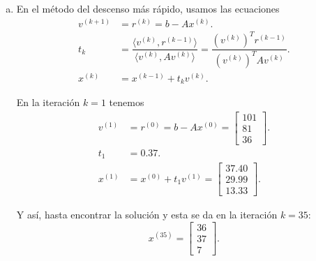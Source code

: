 \begin{frame}
	\begin{solution}
		\begin{enumerate}[b)]
			\item

			      En el método del descenso más rápido, usamos las
			      ecuaciones
			      \begin{align*}
				      v^{\left(k+1\right)} & =
				      r^{\left(k\right)}=
				      b-Ax^{\left(k\right)}.   \\
				      t_{k}                & =
				      \dfrac{
					      \langle
					      v^{\left(k\right)},
					      r^{\left(k-1\right)}
					      \rangle
				      }{
					      \langle
					      v^{\left(k\right)},
					      Av^{\left(k\right)}
					      \rangle
				      }=
				      \dfrac{
				      \left(v^{\left(k\right)}\right)^{T}r^{\left(k-1\right)}
				      }{
				      \left(v^{\left(k\right)}\right)^{T}Av^{\left(k\right)}
				      }.                       \\
				      x^{\left(k\right)}   & =
				      x^{\left(k-1\right)}+
				      t_{k}v^{\left(k\right)}.
			      \end{align*}

			      En la iteración $k=1$ tenemos
			      \begin{align*}
				      v^{\left(1\right)} & =
				      r^{\left(0\right)}=
				      b-Ax^{\left(0\right)}=
				      \begin{bmatrix}
					      101 \\
					      81  \\
					      36
				      \end{bmatrix}.         \\
				      t_{1}              & =
				      0.37.                  \\
				      x^{\left(1\right)} & =
				      x^{\left(0\right)}+
				      t_{1}v^{\left(1\right)}=
				      \begin{bmatrix}
					      37.40 \\
					      29.99 \\
					      13.33
				      \end{bmatrix}.
			      \end{align*}

			      Y así, hasta encontrar la solución y esta se da en la
			      iteración
			      $k=35$:
			      \begin{equation*}
				      x^{\left(35\right)}=
				      \begin{bmatrix}
					      36 \\
					      37 \\
					      7
				      \end{bmatrix}.
			      \end{equation*}
		\end{enumerate}
	\end{solution}
\end{frame}

